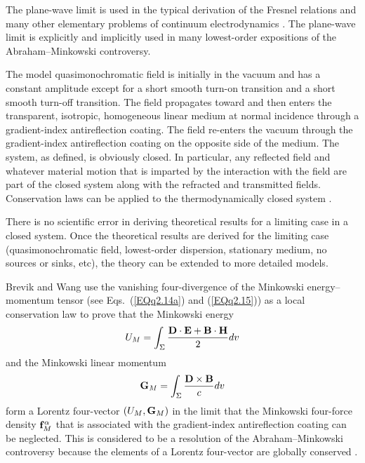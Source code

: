 \documentclass[twocolumn,amssymb,eqsecnum,aps,pra]{revtex4-2}
\begin{document}
The plane-wave limit is used in the typical derivation of the
Fresnel relations and many other elementary problems of continuum
electrodynamics \cite{BIJackson,BIGriff,BIZangwill}.
The plane-wave limit is explicitly and implicitly used in many
lowest-order expositions of the Abraham--Minkowski controversy.
\par
The model quasimonochromatic field is initially in the vacuum and
has a constant amplitude except for a short smooth turn-on transition
and a short smooth turn-off transition.
The field propagates toward and then enters the transparent,
isotropic, homogeneous linear medium at normal incidence
through a gradient-index antireflection coating.
The field re-enters the vacuum through the gradient-index
antireflection coating on the opposite side of the medium.
The system, as defined, is obviously closed.
In particular, any reflected field and whatever material motion
that is imparted by the interaction with the field are part of
the closed system along with the refracted and transmitted fields.
Conservation laws can be applied to the thermodynamically closed
system \cite{BIBrevCons}.
\par
There is no scientific error in deriving theoretical results for
a limiting case in a closed system.
Once the theoretical results are derived for the limiting case 
(quasimonochromatic field, lowest-order dispersion, stationary medium,
no sources or sinks, etc), the theory can be extended to more
detailed models.
\par
Brevik \cite{BIBrevCons,BIBrevik} and Wang \cite{BIWang4Vec} use the
vanishing four-divergence of the Minkowski energy--momentum tensor
(see Eqs.~(\ref{EQq2.14a}) and (\ref{EQq2.15})) as a local
conservation law \cite{BIGiu} to prove that the Minkowski energy
\begin{equation}
U_M=\int_{\Sigma}\frac{{\bf D}\cdot{\bf E}+{\bf B}\cdot{\bf H}}{2} dv
\label{EQq2.01}
\end{equation}
and the Minkowski linear momentum
\begin{equation}
{\bf G}_M=\int_{\Sigma}\frac{{\bf D}\times{\bf B}}{c}dv
\label{EQq2.02}
\end{equation}
form a Lorentz four-vector $(U_M,{\bf G}_M)$ in the limit that the
Minkowski four-force density ${\bf f}^{\alpha}_M$ that is associated
with the gradient-index antireflection coating can be neglected.
This is considered to be a resolution of the Abraham--Minkowski
controversy because the elements of a Lorentz four-vector are globally
conserved \cite{BIWang4Vec,BIGiu}.
\par
\end{document}
